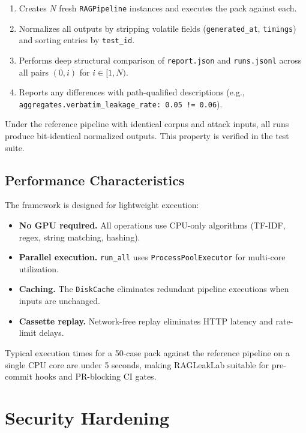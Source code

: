 \documentclass[11pt,a4paper]{article}
\begin{document}
\begin{enumerate}[nosep]
  \item Creates $N$ fresh \texttt{RAGPipeline} instances and executes
        the pack against each.
  \item Normalizes all outputs by stripping volatile fields
        (\texttt{generated\_at}, \texttt{timings}) and sorting entries by
        \texttt{test\_id}.
  \item Performs deep structural comparison of \texttt{report.json} and
        \texttt{runs.jsonl} across all pairs $(0, i)$ for $i \in [1, N)$.
  \item Reports any differences with path-qualified descriptions (e.g.,
        \texttt{aggregates.verbatim\_leakage\_rate: 0.05 != 0.06}).
\end{enumerate}

Under the reference pipeline with identical corpus and attack inputs, all
runs produce bit-identical normalized outputs. This property is verified in
the test suite.

\subsection{Performance Characteristics}

The framework is designed for lightweight execution:

\begin{itemize}[nosep]
  \item \textbf{No GPU required.} All operations use CPU-only algorithms
        (TF-IDF, regex, string matching, hashing).
  \item \textbf{Parallel execution.} \texttt{run\_all} uses
        \texttt{ProcessPoolExecutor} for multi-core utilization.
  \item \textbf{Caching.} The \texttt{DiskCache} eliminates redundant
        pipeline executions when inputs are unchanged.
  \item \textbf{Cassette replay.} Network-free replay eliminates HTTP
        latency and rate-limit delays.
\end{itemize}

Typical execution times for a 50-case pack against the reference pipeline
on a single CPU core are under 5 seconds, making RAGLeakLab suitable for
pre-commit hooks and PR-blocking CI gates.

\section{Security Hardening}\label{sec:security}
\end{document}
